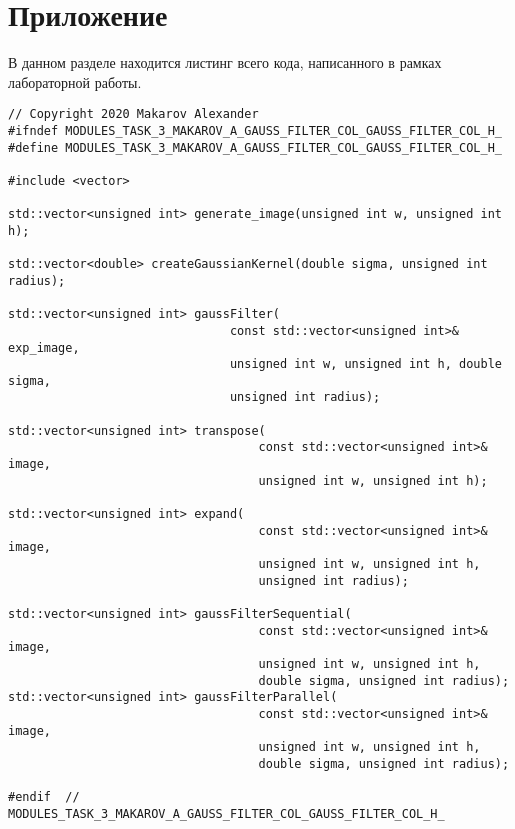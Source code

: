 \documentclass{report}
\begin{document}
\section*{Приложение}
В данном разделе находится листинг всего кода, написанного в рамках лабораторной работы.
\begin{lstlisting}
// Copyright 2020 Makarov Alexander
#ifndef MODULES_TASK_3_MAKAROV_A_GAUSS_FILTER_COL_GAUSS_FILTER_COL_H_
#define MODULES_TASK_3_MAKAROV_A_GAUSS_FILTER_COL_GAUSS_FILTER_COL_H_

#include <vector>

std::vector<unsigned int> generate_image(unsigned int w, unsigned int h);

std::vector<double> createGaussianKernel(double sigma, unsigned int radius);

std::vector<unsigned int> gaussFilter(
                               const std::vector<unsigned int>& exp_image,
                               unsigned int w, unsigned int h, double sigma,
                               unsigned int radius);

std::vector<unsigned int> transpose(
                                   const std::vector<unsigned int>& image,
                                   unsigned int w, unsigned int h);

std::vector<unsigned int> expand(
                                   const std::vector<unsigned int>& image,
                                   unsigned int w, unsigned int h,
                                   unsigned int radius);

std::vector<unsigned int> gaussFilterSequential(
                                   const std::vector<unsigned int>& image,
                                   unsigned int w, unsigned int h,
                                   double sigma, unsigned int radius);
std::vector<unsigned int> gaussFilterParallel(
                                   const std::vector<unsigned int>& image,
                                   unsigned int w, unsigned int h,
                                   double sigma, unsigned int radius);

#endif  // MODULES_TASK_3_MAKAROV_A_GAUSS_FILTER_COL_GAUSS_FILTER_COL_H_
\end{lstlisting}
\end{document}
